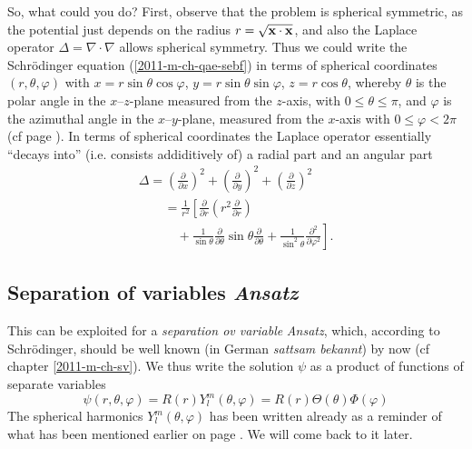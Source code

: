 So, what could you do?
First, observe that the problem is spherical symmetric,
as the potential   just depends on the radius $r=\sqrt{{\bf x}\cdot {\bf x}}$,
and also the Laplace operator $\Delta =
\nabla \cdot \nabla $ allows spherical symmetry.
Thus we could write   the Schr\"odinger equation (\ref{2011-m-ch-qae-sebf})
in terms of spherical coordinates
$(r, \theta ,\varphi )$ with
$x  = r\sin \theta \cos \varphi$,
$y = r\sin \theta \sin \varphi$,
$z = r\cos \theta $,
whereby  $\theta$ is the polar angle in the $x$--$z$-plane measured
from the $z$-axis, with $0 \le \theta \le \pi$,
and $\varphi $ is  the azimuthal angle in the $x$--$y$-plane, measured
from the $x$-axis with $0 \le \varphi < 2 \pi$
(cf page \pageref{2011-m-spericalcoo}).
In terms of spherical coordinates the Laplace operator
essentially ``decays into'' (i.e. consists addiditively of)
a radial part and an angular part
\begin{equation}
\begin{array}{l}
\Delta =
\left( \frac{\partial}{\partial x}\right)^2
+
\left( \frac{\partial}{\partial y}\right)^2
+
\left( \frac{\partial}{\partial z}\right)^2
\\
\qquad
=
\frac{1}{r^2} \left[ \frac{\partial}{\partial r}\left( r^2\frac{\partial}{\partial r}\right)  \right. \\
\qquad \quad
+  \left.
\frac{1}{\sin \theta}   \frac{\partial}{\partial \theta }
\sin \theta \frac{\partial}{\partial \theta }
+
\frac{1}{\sin^2 \theta} \frac{\partial^2}{\partial \varphi^2 }
\right].
\end{array}
\label{2011-m-ch-qae-losc}
\end{equation}

\subsection{Separation of variables {\it Ansatz}}

This can be exploited for a
{\em separation ov variable} {\it Ansatz},
which, according to  Schr\"odinger, should be well known
(in German {\em sattsam bekannt})
by now (cf chapter \ref{2011-m-ch-sv}).
We thus write the solution $\psi$ as a product of functions
of separate variables
\begin{equation}
\psi (r, \theta ,\varphi ) = R(r)Y_l^m ( \theta ,\varphi )
=R(r)\Theta(\theta)\Phi(\varphi)
\label{2011-m-ch-qaesva}
\end{equation}
The spherical harmonics $Y_l^m ( \theta ,\varphi )$  has been
written already as a reminder of what has been mentioned earlier
on page  \pageref{2011-m-ch-sfshar}.
We will come back to it later.

